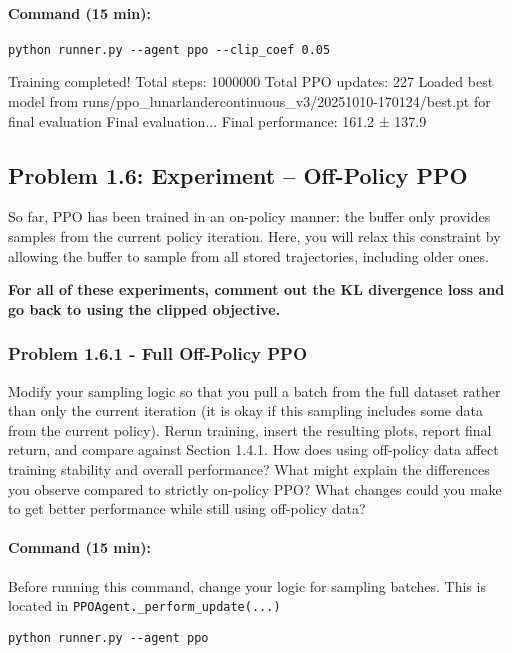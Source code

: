 \documentclass[12pt]{article}
\begin{document}
\paragraph{Command (15 min):}
\begin{verbatim}
python runner.py --agent ppo --clip_coef 0.05
\end{verbatim}

\begin{solution}[height=5cm]

Training completed! Total steps: 1000000
Total PPO updates: 227
Loaded best model from runs/ppo_lunarlandercontinuous_v3/20251010-170124/best.pt for final evaluation
Final evaluation...
Final performance: 161.2 ± 137.9

\end{solution}

\newpage
\subsection*{Problem 1.6: Experiment – Off-Policy PPO}

So far, PPO has been trained in an on-policy manner: the buffer only provides samples from the current policy iteration. Here, you will relax this constraint by allowing the buffer to sample from all stored trajectories, including older ones.

\textbf{For all of these experiments, comment out the KL divergence loss and go back to using the clipped objective.}

\subsubsection*{Problem 1.6.1 - Full Off-Policy PPO}
Modify your sampling logic so that you pull a batch from the full dataset rather than only the current iteration (it is okay if this sampling includes some data from the current policy). Rerun training, insert the resulting plots, report final return, and compare against Section 1.4.1. How does using off-policy data affect training stability and overall performance? What might explain the differences you observe compared to strictly on-policy PPO?  What changes could you make to get better performance while still using off-policy data?

\paragraph{Command (15 min):} Before running this command, change your logic for sampling batches.  This is located in \texttt{PPOAgent.\_perform\_update(...)}
\begin{verbatim}
python runner.py --agent ppo
\end{verbatim}
\end{document}

